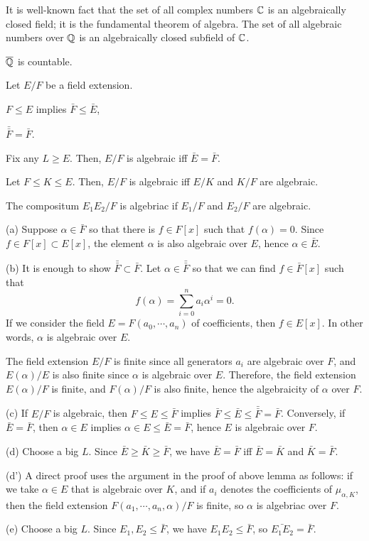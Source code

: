 \documentclass{../../large}
\begin{document}
\begin{prb}
It is well-known fact that the set of all complex numbers $\mathbb{C}$ is an algebraically closed field; it is the fundamental theorem of algebra.
The set of all algebraic numbers over $\mathbb{Q}$ is an algebraically closed subfield of $\mathbb{C}$.
\begin{parts}
\item $\overline{\mathbb{Q}}$ is countable.
\end{parts}
\end{prb}

\begin{prb}
Let $E/F$ be a field extension.
\begin{parts}
\item $F\le E$ implies $\bar F\le \bar E$,
\item $\bar{\bar F}=\bar F$.
\item Fix any $L\ge E$. Then, $E/F$ is algebraic iff $\bar E=\bar F$.
\item Let $F\le K\le E$. Then, $E/F$ is algebraic iff $E/K$ and $K/F$ are algebraic.
\item The compositum $E_1E_2/F$ is algebriac if $E_1/F$ and $E_2/F$ are algebraic.
\end{parts}
\end{prb}
\begin{pf}
(a)
Suppose $\alpha\in\bar F$ so that there is $f\in F[x]$ such that $f(\alpha)=0$.
Since $f\in F[x]\subset E[x]$, the element $\alpha$ is also algebraic over $E$, hence $\alpha\in\bar E$.

(b)
It is enough to show $\bar{\bar F}\subset\bar F$.
Let $\alpha\in\bar{\bar F}$ so that we can find $f\in\bar F[x]$ such that
\[f(\alpha)=\sum_{i=0}^na_i\alpha^i=0.\]
If we consider the field $E=F(a_0,\cdots,a_n)$ of coefficients, then $f\in E[x]$.
In other words, $\alpha$ is algebraic over $E$.

The field extension $E/F$ is finite since all generators $a_i$ are algebraic over $F$, and $E(\alpha)/E$ is also finite since $\alpha$ is algebraic over $E$.
Therefore, the field extension $E(\alpha)/F$ is finite, and $F(\alpha)/F$ is also finite, hence the algebraicity of $\alpha$ over $F$.

(c)
If $E/F$ is algebraic, then $F\le E\le\bar F$ implies $\bar F\le\bar E\le\bar{\bar F}=\bar F$.
Conversely, if $\bar E=\bar F$, then $\alpha\in E$ implies $\alpha\in E\le\bar E=\bar F$, hence $E$ is algebraic over $F$.

(d)
Choose a big $L$.
Since $\bar E\ge\bar K\ge\bar F$, we have $\bar E=\bar F$ iff $\bar E=\bar K$ and $\bar K=\bar F$.

(d')
A direct proof uses the argument in the proof of above lemma as follows: if we take $\alpha\in E$ that is algebraic over $K$, and if $a_i$ denotes the coefficients of $\mu_{\alpha,K}$, then the field extension $F(a_1,\cdots,a_n,\alpha)/F$ is finite, so $\alpha$ is algebriac over $F$.

(e)
Choose a big $L$.
Since $E_1,E_2\le\bar F$, we have $E_1E_2\le\bar F$, so $\bar{E_1E_2}=\bar{F}$.
\end{pf}
\end{document}
